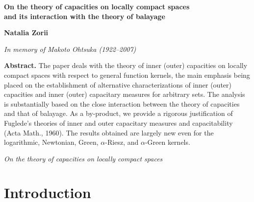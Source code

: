 \documentclass[12pt,a4paper,reqno]{amsart} %
\theoremstyle{lause}
\theoremstyle{maaritelma}
\theoremstyle{lause}
\theoremstyle{maaritelma}
\numberwithin{equation}{section}
\begin{document}
\thispagestyle{empty}


\begin{center}

{\large{\textbf{On the theory of capacities on locally compact spaces\\ and its interaction with the theory of balayage}}}

\vspace{18pt}

\textbf{Natalia Zorii}

\vspace{18pt}

\emph{In memory of Makoto Ohtsuka (1922--2007)}\vspace{8pt}


\footnotesize{\address{Institute of Mathematics, Academy of Sciences
of Ukraine, Tereshchenkivska~3, 01601,
Kyiv-4, Ukraine\\
natalia.zorii@gmail.com }}

\end{center}

\vspace{12pt}

{\footnotesize{\textbf{Abstract.}
The paper deals with the theory of inner (outer) capacities on locally compact spaces with respect to general function kernels,
the main emphasis being placed on the establishment of alternative  characterizations of inner (outer) capacities and inner (outer) capacitary measures for arbitrary sets. The analysis is substantially based on the close interaction between the theory of capacities and that of balayage. As a by-product, we provide a rigorous justification of Fuglede's theories of inner and outer capacitary measures and capacitability (Acta Math., 1960).
The results obtained are largely new even for the logarithmic, Newtonian, Green, $\alpha$-Riesz, and $\alpha$-Green kernels.
}}

\vspace{6pt}

 {\emph{On the theory of capacities on locally compact spaces}}



\section{Introduction}
\end{document}

